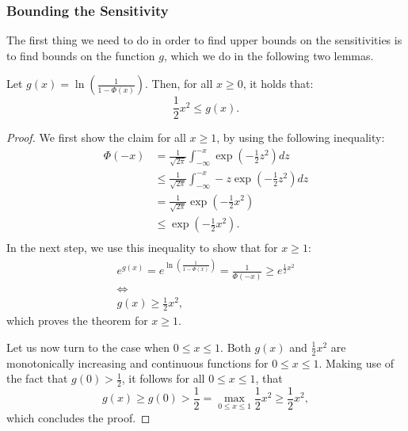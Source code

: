 \subsubsection{Bounding the Sensitivity}

The first thing we need to do in order to find upper bounds on
the sensitivities is to find bounds on the function $g$,
which we do in the following two lemmas.

\begin{lemma}
    \label{lemma:lower-bound}
    Let $g(x) = \ln \left( \frac{1}{1 - \Phi(x)}\right)$.
    Then, for all $x \geq 0$, it holds that:
    \begin{equation*}
        \frac{1}{2} x^2 \leq g(x).
    \end{equation*}
\end{lemma}
\begin{proof}
    We first show the claim for all $x \geq 1$, by using the following
    inequality:
    \begin{align*}
        \Phi(-x) & = \frac{1}{\sqrt{2 \pi}} \int_{-\infty}^{-x} \exp{ \left(-\frac{1}{2} z^2 \right)} dz       \\
                 & \leq \frac{1}{\sqrt{2 \pi}} \int_{-\infty}^{-x} -z \exp{ \left(-\frac{1}{2} z^2 \right)} dz \\
                 & = \frac{1}{\sqrt{2 \pi}} \exp{\left( -\frac{1}{2} x^2 \right)}                              \\
                 & \leq \exp{\left( -\frac{1}{2} x^2 \right)}.                                                 \\
    \end{align*}
    In the next step, we use this inequality to show that for $x \geq 1$:
    \begin{gather*}
        e^{g(x)} = e^{\ln \left( \frac{1}{1 - \Phi(x)} \right)} = \frac{1}{\Phi(-x)} \geq e^{\frac{1}{2} x^2}\\
        \iff \\
        g(x) \geq \frac{1}{2} x^2,
    \end{gather*}
    which proves the theorem for $x \geq 1$.

    Let us now turn to the case when $0 \leq x \leq 1$.
    Both $g(x)$ and $\frac{1}{2}x^2$ are monotonically increasing
    and continuous functions for $0 \leq x \leq 1$.
    Making use of the fact that $g(0) > \frac{1}{2}$, it follows
    for all $0 \leq x \leq 1$, that
    \begin{equation*}
        g(x) \geq g(0) > \frac{1}{2} = \max_{0 \leq x \leq 1} \frac{1}{2} x^2 \geq \frac{1}{2} x^2,
    \end{equation*}
    which concludes the proof.
\end{proof}

